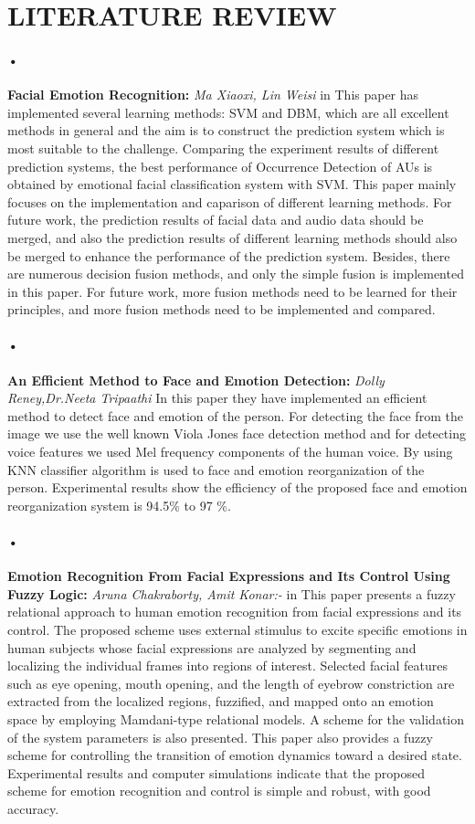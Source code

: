 \documentclass[a4paper,12pt,oneside]{article}
\begin{document}
\newpage
\section{LITERATURE REVIEW}
\paragraph{•}
\textbf{Facial Emotion Recognition:}
\textit{Ma Xiaoxi, Lin Weisi }
in This paper has implemented several learning methods:
SVM and DBM, which are all excellent methods in general
and the aim is to construct the prediction system which is
most suitable to the challenge. Comparing the experiment
results of different prediction systems, the best performance
of Occurrence Detection of AUs is obtained by emotional facial classification system with SVM. This paper mainly
focuses on the implementation and caparison of different
learning methods. For future work, the prediction results of
facial data and audio data should be merged, and also the
prediction results of different learning methods should also
be merged to enhance the performance of the prediction
system. Besides, there are numerous decision fusion methods,
and only the simple fusion is implemented in this paper. For
future work, more fusion methods need to be learned for
their principles, and more fusion methods need to be
implemented and compared.
\paragraph{•}
\textbf{An Efficient Method to Face and Emotion Detection:}
\textit{Dolly Reney,Dr.Neeta Tripaathi }
In this paper they have implemented an efficient method to detect
face and emotion of the person. For detecting the face from
the image we use the well known Viola Jones face detection
method and for detecting voice features we used Mel
frequency components of the human voice. By using KNN
classifier algorithm is used to face and emotion
reorganization of the person. Experimental results show the
efficiency of the proposed face and emotion reorganization
system is 94.5\% to 97 \%.
\paragraph{•}
\textbf{Emotion Recognition From Facial Expressions and
Its Control Using Fuzzy Logic:}
\textit{Aruna Chakraborty, Amit Konar:-}
in This paper presents a fuzzy relational approach to
human emotion recognition from facial expressions and its control.
The proposed scheme uses external stimulus to excite specific
emotions in human subjects whose facial expressions are analyzed
by segmenting and localizing the individual frames into regions
of interest. Selected facial features such as eye opening, mouth
opening, and the length of eyebrow constriction are extracted
from the localized regions, fuzzified, and mapped onto an emotion
space by employing Mamdani-type relational models. A scheme
for the validation of the system parameters is also presented. This
paper also provides a fuzzy scheme for controlling the transition
of emotion dynamics toward a desired state. Experimental results
and computer simulations indicate that the proposed scheme for
emotion recognition and control is simple and robust, with good
accuracy.
\end{document}
